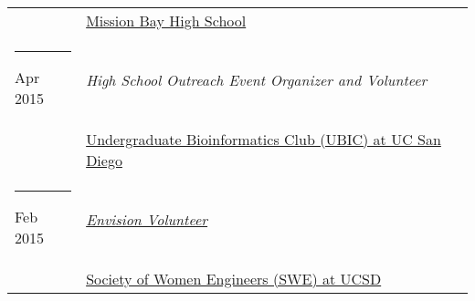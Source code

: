 \documentclass[margin,line]{res}
\begin{document}
\begin{resume}
\begin{longtable}{@{}p{0.7in}p{4in}}
\hspace*{-4mm} & \hspace{4mm} \href{https://www.sandiegounified.org/schools/mission-bay}{Mission Bay High School}\\
\hspace*{-4mm} \rule{-1mm}{5mm} Apr 2015 & \textit{High School Outreach Event Organizer and Volunteer}\\*
\hspace*{-4mm} & \hspace{4mm} \href{http://ubicucsd.github.io/}{Undergraduate Bioinformatics Club (UBIC) at UC San Diego}\\
\hspace*{-4mm} \rule{-1mm}{5mm} Feb 2015 & \href{http://ucsdenvision.wixsite.com/envision}{\textit{Envision Volunteer}}\\*
\hspace*{-4mm} & \hspace{4mm} \href{http://swe.ucsd.edu/}{Society of Women Engineers (SWE) at UCSD}\\
\end{longtable}


\end{resume}
\end{document}

